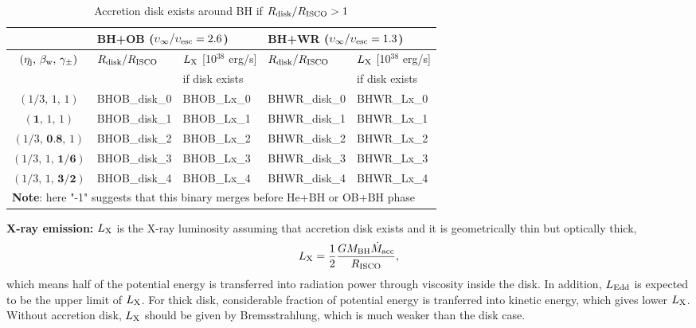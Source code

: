 \documentclass{article}
\begin{document}
\begin{table}[!htbp]
	\centering
\large
	\caption{\Large Accretion disk exists around BH if $R_{\rm disk}/R_{\rm ISCO} > 1$ }
\begin{tabular}{c|l|l|l|l}
\hline
\hline
                                             & \multicolumn{2}{l|}{BH+OB ($\upsilon_\infty/\upsilon_{\rm esc}=2.6$)}                & \multicolumn{2}{l}{BH+WR ($\upsilon_\infty/\upsilon_{\rm esc}=1.3$)}                \\ \hline
$(\eta_{\rm j},\,\beta_{\rm w},\,\gamma_\pm)$ & \multicolumn{1}{l|}{$R_{\rm disk}/R_{\rm ISCO}$} & $L_{\rm X}$ {[}10$^{38}$ erg/s{]} & \multicolumn{1}{l|}{$R_{\rm disk}/R_{\rm ISCO}$} & $L_{\rm X}$ {[}10$^{38}$ erg/s{]} \\ 
					     &  &      if disk exists          &  &  if disk exists               \\ \hline
$(1/3,\,1,\,1)$                              & 
	{BHOB_disk_0}           & {BHOB_Lx_0}                   & {BHWR_disk_0}           & {BHWR_Lx_0}                   \\ \hline
	$(\textbf{1},\,1,\,1)$                                & 
	{BHOB_disk_1}           & {BHOB_Lx_1}                   & {BHWR_disk_1}           & {BHWR_Lx_1}                   \\ \hline
	$(1/3,\,\textbf{0.8},\,1)$                            & 
	{BHOB_disk_2}           & {BHOB_Lx_2}                   & {BHWR_disk_2}           & {BHWR_Lx_2}                   \\ \hline
	$(1/3,\,1,\,\textbf{1/6})$                            & 
	{BHOB_disk_3}           & {BHOB_Lx_3}                   & {BHWR_disk_3}           & {BHWR_Lx_3}                   \\ \hline
	$(1/3,\,1,\,\textbf{3/2})$                            & 
	{BHOB_disk_4}           & {BHOB_Lx_4}                   & {BHWR_disk_4}           & {BHWR_Lx_4}                   \\ \hline
	        \multicolumn{5}{l}{\textbf{Note}: \normalsize here "-1" suggests that this binary merges before He+BH or OB+BH phase} \\\hline

\end{tabular}
\end{table}

\textbf{\Large X-ray emission:}
\normalsize
$L_{\rm X}$ is the X-ray luminosity assuming that accretion disk exists and it is geometrically thin but optically thick,
\begin{equation}
	L_{\rm X}=\frac{1}{2}\frac{GM_{\rm BH}\dot{M}_{\rm acc}}{R_{\rm ISCO}},
\end{equation}
which means half of the potential energy is transferred into radiation power through viscosity inside the disk. In addition, $L_{\rm Edd}$ is expected to be the upper limit of $L_{\rm X}$. For thick disk, considerable fraction of potential energy is tranferred into  kinetic energy, which gives lower $L_{\rm X}$. Without accretion disk, $L_{\rm X}$ should be given by Bremsstrahlung, which is much weaker than the disk case.
\end{document}
